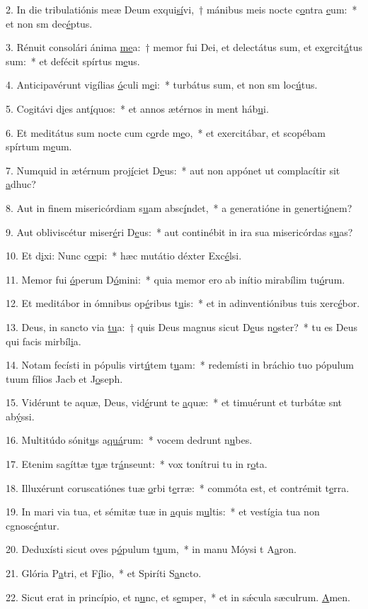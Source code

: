 2. In die tribulatiónis meæ Deum exqui\uline{sí}vi,~† mánibus meis nocte c\uline{o}ntra \uline{e}um:~* et non sm dec\uline{é}ptus.\par 
3. Rénuit consolári ánima \uline{me}a:~† memor fui Dei, et delectátus sum, et ex\uline{e}rcit\uline{á}tus sum:~* et defécit spírtus m\uline{e}us.\par 
4. Anticipavérunt vigílias \uline{ó}culi m\uline{e}i:~* turbátus sum, et non sm loc\uline{ú}tus.\par 
5. Cogitávi d\uline{i}es ant\uline{í}quos:~* et annos ætérnos in ment háb\uline{u}i.\par 
6. Et meditátus sum nocte cum c\uline{o}rde m\uline{e}o,~* et exercitábar, et scopébam spírtum m\uline{e}um.\par 
7. Numquid in ætérnum proj\uline{í}ciet D\uline{e}us:~* aut non appónet ut complacítir sit \uline{a}dhuc?\par 
8. Aut in finem misericórdiam s\uline{u}am absc\uline{í}ndet,~* a generatióne in generti\uline{ó}nem?\par 
9. Aut obliviscétur miser\uline{é}ri D\uline{e}us:~* aut continébit in ira sua misericórdas s\uline{u}as?\par 
10. Et d\uline{i}xi: Nunc c\uline{œ}pi:~* hæc mutátio déxter Exc\uline{é}lsi.\par 
11. Memor fui \uline{ó}perum D\uline{ó}mini:~* quia memor ero ab inítio mirabílim tu\uline{ó}rum.\par 
12. Et meditábor in ómnibus op\uline{é}ribus t\uline{u}is:~* et in adinventiónibus tuis xerc\uline{é}bor.\par 
13. Deus, in sancto via \uline{tu}a:~† quis Deus magnus sicut D\uline{e}us n\uline{o}ster?~* tu es Deus qui facis mirbíl\uline{i}a.\par 
14. Notam fecísti in pópulis virt\uline{ú}tem t\uline{u}am:~* redemísti in bráchio tuo pópulum tuum fílios Jacb et J\uline{o}seph.\par 
15. Vidérunt te aquæ, Deus, vid\uline{é}runt te \uline{a}quæ:~* et timuérunt et turbátæ snt ab\uline{ý}ssi.\par 
16. Multitúdo sónit\uline{u}s a\uline{quá}rum:~* vocem dedrunt n\uline{u}bes.\par 
17. Etenim sagíttæ t\uline{u}æ tr\uline{á}nseunt:~* vox tonítrui tu in r\uline{o}ta.\par 
18. Illuxérunt coruscatiónes tuæ \uline{o}rbi t\uline{e}rræ:~* commóta est, et contrémit t\uline{e}rra.\par 
19. In mari via tua, et sémitæ tuæ in \uline{a}quis m\uline{u}ltis:~* et vestígia tua non cgnosc\uline{é}ntur.\par 
20. Deduxísti sicut oves p\uline{ó}pulum t\uline{u}um,~* in manu Móysi t A\uline{a}ron.\par 
21. Glória P\uline{a}tri, et F\uline{í}lio,~* et Spiríti S\uline{a}ncto.\par 
22. Sicut erat in princípio, et n\uline{u}nc, et s\uline{e}mper,~* et in sǽcula sæculrum. \uline{A}men.\par 
